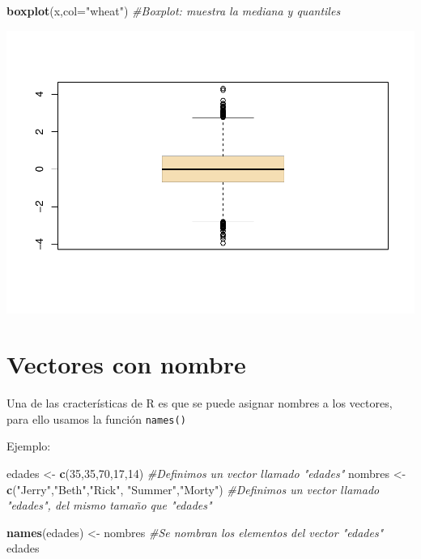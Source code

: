 \documentclass[
]{book}
\newenvironment{Shaded}{\begin{snugshade}}{\end{snugshade}}
\newcommand{\AttributeTok}[1]{\textcolor[rgb]{0.13,0.29,0.53}{#1}}
\newcommand{\CommentTok}[1]{\textcolor[rgb]{0.56,0.35,0.01}{\textit{#1}}}
\newcommand{\DecValTok}[1]{\textcolor[rgb]{0.00,0.00,0.81}{#1}}
\newcommand{\FunctionTok}[1]{\textcolor[rgb]{0.13,0.29,0.53}{\textbf{#1}}}
\newcommand{\NormalTok}[1]{#1}
\newcommand{\OtherTok}[1]{\textcolor[rgb]{0.56,0.35,0.01}{#1}}
\newcommand{\StringTok}[1]{\textcolor[rgb]{0.31,0.60,0.02}{#1}}
\begin{document}
\begin{Shaded}
\begin{Highlighting}[]
\FunctionTok{boxplot}\NormalTok{(x,}\AttributeTok{col=}\StringTok{"wheat"}\NormalTok{) }\CommentTok{\#Boxplot: muestra la mediana y quantiles}
\end{Highlighting}
\end{Shaded}

\includegraphics{bookdown-demo_files/figure-latex/unnamed-chunk-77-3.pdf}

\section{Vectores con nombre}\label{vectores-con-nombre}

Una de las cracterísticas de R es que se puede asignar nombres a los vectores, para ello usamos la función \texttt{names()}

Ejemplo:

\begin{Shaded}
\begin{Highlighting}[]
\NormalTok{edades }\OtherTok{\textless{}{-}} \FunctionTok{c}\NormalTok{(}\DecValTok{35}\NormalTok{,}\DecValTok{35}\NormalTok{,}\DecValTok{70}\NormalTok{,}\DecValTok{17}\NormalTok{,}\DecValTok{14}\NormalTok{) }\CommentTok{\#Definimos un vector llamado "edades"}
\NormalTok{nombres }\OtherTok{\textless{}{-}} \FunctionTok{c}\NormalTok{(}\StringTok{"Jerry"}\NormalTok{,}\StringTok{"Beth"}\NormalTok{,}\StringTok{"Rick"}\NormalTok{, }\StringTok{"Summer"}\NormalTok{,}\StringTok{"Morty"}\NormalTok{) }\CommentTok{\#Definimos un vector llamado "edades", del mismo tamaño que "edades"}

\FunctionTok{names}\NormalTok{(edades) }\OtherTok{\textless{}{-}}\NormalTok{ nombres }\CommentTok{\#Se nombran los elementos del vector "edades"}
\NormalTok{edades}
\end{Highlighting}
\end{Shaded}
\end{document}
